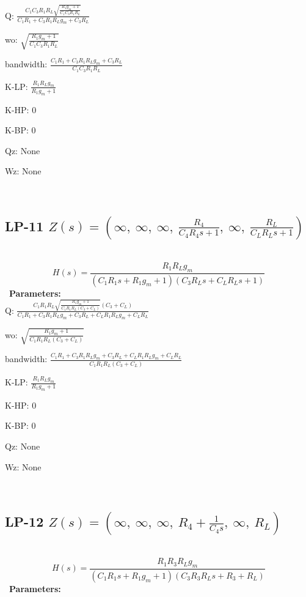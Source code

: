 \documentclass{article}
\begin{document}
Q: $\frac{C_{1} C_{3} R_{1} R_{L} \sqrt{\frac{R_{1} g_{m} + 1}{C_{1} C_{3} R_{1} R_{L}}}}{C_{1} R_{1} + C_{3} R_{1} R_{L} g_{m} + C_{3} R_{L}}$\ 

wo: $\sqrt{\frac{R_{1} g_{m} + 1}{C_{1} C_{3} R_{1} R_{L}}}$\ 

bandwidth: $\frac{C_{1} R_{1} + C_{3} R_{1} R_{L} g_{m} + C_{3} R_{L}}{C_{1} C_{3} R_{1} R_{L}}$\ 

K-LP: $\frac{R_{1} R_{L} g_{m}}{R_{1} g_{m} + 1}$\ 

K-HP: $0$\ 

K-BP: $0$\ 

Qz: $\text{None}$\ 

Wz: $\text{None}$\ 

\ 

\subsection{LP-11 $Z(s) = \left( \infty, \  \infty, \  \infty, \  \frac{R_{4}}{C_{4} R_{4} s + 1}, \  \infty, \  \frac{R_{L}}{C_{L} R_{L} s + 1}\right)$ } \ 
\textbf{\[H(s) = \frac{R_{1} R_{L} g_{m}}{\left(C_{1} R_{1} s + R_{1} g_{m} + 1\right) \left(C_{3} R_{L} s + C_{L} R_{L} s + 1\right)}\] } \ 
\textbf{Parameters:}\\ 

Q: $\frac{C_{1} R_{1} R_{L} \sqrt{\frac{R_{1} g_{m} + 1}{C_{1} R_{1} R_{L} \left(C_{3} + C_{L}\right)}} \left(C_{3} + C_{L}\right)}{C_{1} R_{1} + C_{3} R_{1} R_{L} g_{m} + C_{3} R_{L} + C_{L} R_{1} R_{L} g_{m} + C_{L} R_{L}}$\ 

wo: $\sqrt{\frac{R_{1} g_{m} + 1}{C_{1} R_{1} R_{L} \left(C_{3} + C_{L}\right)}}$\ 

bandwidth: $\frac{C_{1} R_{1} + C_{3} R_{1} R_{L} g_{m} + C_{3} R_{L} + C_{L} R_{1} R_{L} g_{m} + C_{L} R_{L}}{C_{1} R_{1} R_{L} \left(C_{3} + C_{L}\right)}$\ 

K-LP: $\frac{R_{1} R_{L} g_{m}}{R_{1} g_{m} + 1}$\ 

K-HP: $0$\ 

K-BP: $0$\ 

Qz: $\text{None}$\ 

Wz: $\text{None}$\ 

\ 

\subsection{LP-12 $Z(s) = \left( \infty, \  \infty, \  \infty, \  R_{4} + \frac{1}{C_{4} s}, \  \infty, \  R_{L}\right)$ } \ 
\textbf{\[H(s) = \frac{R_{1} R_{3} R_{L} g_{m}}{\left(C_{1} R_{1} s + R_{1} g_{m} + 1\right) \left(C_{3} R_{3} R_{L} s + R_{3} + R_{L}\right)}\] } \ 
\textbf{Parameters:}\\ 
\end{document}
